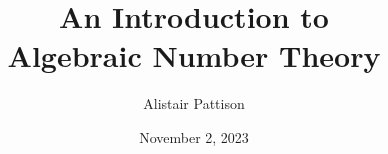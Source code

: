 \documentclass{beamer}
\title{{\small An Introduction to} \\ Algebraic Number Theory}
\author{Alistair Pattison}
\date{November 2, 2023}
\begin{document}
\begin{frame}
	\titlepage
\end{frame}






\end{document}
